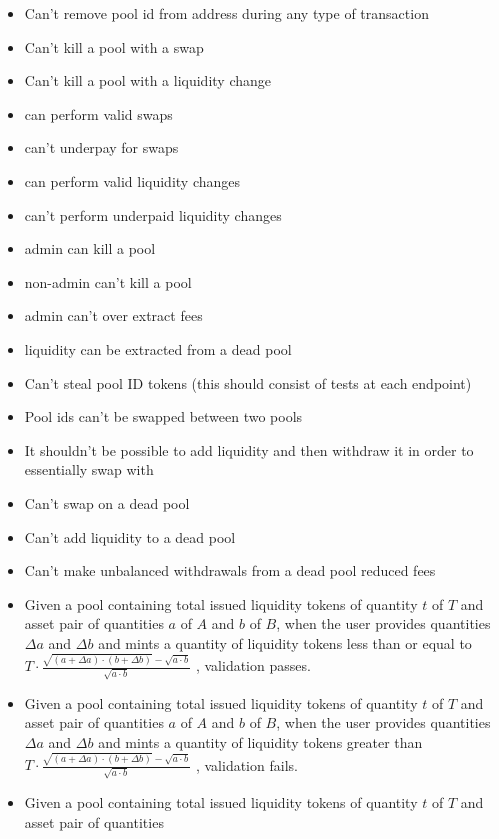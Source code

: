 \documentclass{article}
\begin{document}
\begin{itemize}
	\item Can't remove pool id from address during any type of transaction
	\item Can't kill a pool with a swap
	\item Can't kill a pool with a liquidity change
	\item can perform valid swaps
	\item can't underpay for swaps
	\item can perform valid liquidity changes
	\item can't perform underpaid liquidity changes
	\item admin can kill a pool
	\item non-admin can't kill a pool
	\item admin can't over extract fees
	\item liquidity can be extracted from a dead pool
	\item Can't steal pool ID tokens (this should consist of tests at each endpoint)
	\item Pool ids can't be swapped between two pools
  \item It shouldn't be possible to add liquidity and then withdraw it in order to essentially swap with
	\item Can't swap on a dead pool
	\item Can't add liquidity to a dead pool
	\item Can't make unbalanced withdrawals from a dead pool
    reduced fees
	\item Given a pool containing total issued liquidity tokens of quantity $t$ of $T$ and asset
	      pair of quantities $a$ of $A$ and $b$ of $B$, when the user provides quantities $\Delta a$ and $\Delta b$
  	      and mints a quantity of liquidity tokens less than or equal to
	      $T \cdot \frac{\sqrt{ (a + \Delta a) \cdot (b + \Delta b)} - \sqrt{a \cdot b}}{\sqrt{a \cdot b}}$
	      , validation passes.
	\item Given a pool containing total issued liquidity tokens of quantity $t$ of $T$ and asset
	      pair of quantities $a$ of $A$ and $b$ of $B$, when the user provides quantities $\Delta a$ and $\Delta b$
	      and mints a quantity of liquidity tokens greater than
              $T \cdot \frac{\sqrt{ (a + \Delta a) \cdot (b + \Delta b)} - \sqrt{a \cdot b}}{\sqrt{a \cdot b}}$
	      , validation fails.
	\item Given a pool containing total issued liquidity tokens of quantity $t$ of $T$ and asset pair of quantities

\end{itemize}
\end{document}
